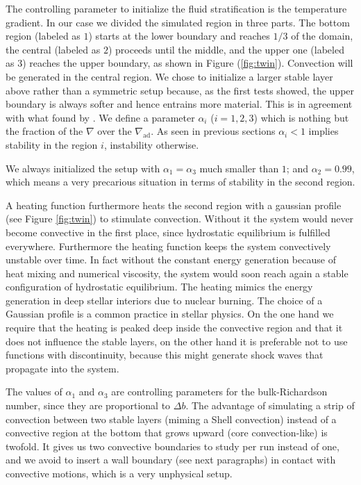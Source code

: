 The controlling parameter to initialize the fluid stratification is the temperature gradient. In our case we divided the simulated region in three parts. The bottom region (labeled as $1$) starts at the lower boundary and reaches $1/3$ of the domain, the central (labeled as $2$) proceeds until the middle, and the upper one (labeled as $3$) reaches the upper boundary, as shown in Figure (\ref{fig:twin}). Convection will be generated in the central region. We chose to initialize a larger stable layer above rather than a symmetric setup because, as the first tests showed, the upper boundary is always softer and hence entrains more material. This is in agreement with what found by \citet{meakin}. We define a parameter $\alpha_{i}$ ($i=1, 2, 3$) which is nothing but the fraction of the $\nabla$ over the $\nabla_{\mathrm{ad}}$. As seen in previous sections $\alpha_{i}<1$ implies stability in the region $i$, instability otherwise. 

We always initialized the setup with $\alpha_{1} = \alpha_{3}$ much smaller than $1$; and $\alpha_{2}=0.99$, which means a very precarious situation in terms of stability in the second region. 

A heating function furthermore heats the second region with a gaussian profile (see Figure \ref{fig:twin}) to stimulate convection. Without it the system would never become convective in the first place, since hydrostatic equilibrium is fulfilled everywhere. Furthermore the heating function keeps the system convectively unstable over time. In fact without the constant energy generation because of heat mixing and numerical viscosity, the system would soon reach again a stable configuration of hydrostatic equilibrium. The heating mimics the energy generation in deep stellar interiors due to nuclear burning. The choice of a Gaussian profile is a common practice in stellar physics. On the one hand we require that the heating is peaked deep inside the convective region and that it does not influence the stable layers, on the other hand it is preferable not to use functions with discontinuity, because this might generate shock waves that propagate into the system.

The values of $\alpha_{1}$ and $\alpha_{3}$ are controlling parameters for the bulk-Richardson number, since they are proportional to $\Delta b$. The advantage of simulating a strip of convection between two stable layers (miming a Shell convection) instead of a convective region at the bottom that grows upward (core convection-like) is twofold. It gives us two convective boundaries to study per run instead of one, and we avoid to insert a wall boundary (see next paragraphs) in contact with convective motions, which is a very unphysical setup. 

